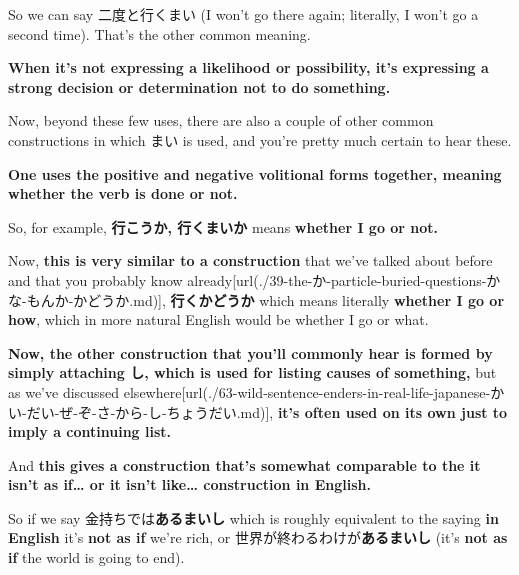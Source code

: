 So we can say 二度と行くまい (I won't go there again; literally, I won't go a second time). That's the other common meaning.

{\bf When it's not expressing a likelihood or possibility, it's expressing a strong decision or determination not to do something.}

{}

Now, beyond these few uses, there are also a couple of other common constructions in which まい is used, and you're pretty much certain to hear these.

\stopsectionlevel

\startsectionlevel[title={Using positive & negative volitional together},reference={using-positive-negative-volitional-together}]

{\bf One uses the positive and negative volitional forms together, meaning whether the verb is done or not.}

So, for example, {\bf 行こうか, 行くまいか} means {\bf whether I go or not.}

{}

Now, {\bf this is very similar to a construction} that we've talked about before and that you probably know already\goto{{[}39{]}}[url(./39-the-か-particle-buried-questions-かな-もんか-かどうか.md)], {\bf 行くかどうか} which means literally {\bf whether I go or how}, which in more natural English would be whether I go or what.

\stopsectionlevel

\startsectionlevel[title={Attaching し to the まい construction},reference={attaching-し-to-the-まい-construction}]

{\bf Now, the other construction that you'll commonly hear is formed by simply attaching し, which is used for listing causes of something,} but as we've discussed elsewhere\goto{{[}63{]}}[url(./63-wild-sentence-enders-in-real-life-japanese-かい-だい-ぜ-ぞ-さ-から-し-ちょうだい.md)], {\bf it's often used on its own just to imply a continuing list.}

{}

And {\bf this gives a construction that's somewhat comparable to the it isn't as if\ldots{} or it isn't like\ldots{} construction in English.}

So if we say 金持ちでは{\bf あるまいし} which is roughly equivalent to the saying {\bf in English} it's {\bf not as if} we're rich, or 世界が終わるわけが{\bf あるまいし} (it's {\bf not as if} the world is going to end).

